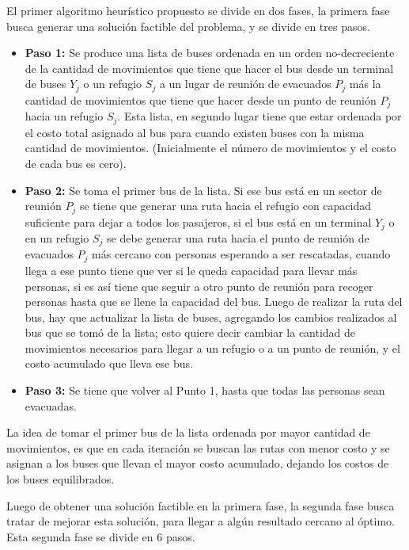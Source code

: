 \documentclass[letter, 10pt]{article}
\begin{document}
El primer algoritmo heurístico propuesto \cite{bish2011planning} se divide en dos fases, la primera fase busca generar una solución factible del problema, y se divide en tres pasos.
\begin{itemize}
\item \textbf{Paso 1:} Se produce una lista de buses ordenada en un orden no-decreciente de la cantidad de movimientos que tiene que hacer el bus desde un terminal de buses $Y_j$ o un refugio $S_j$ a un lugar de reunión de evacuados $P_j$ más la cantidad de movimientos que tiene que hacer desde un punto de reunión $P_j$ hacia un refugio $S_j$. Esta lista, en segundo lugar tiene que estar ordenada por el costo total asignado al bus para cuando existen buses con la misma cantidad de movimientos. (Inicialmente el número de movimientos y el costo de cada bus es cero).  
\item \textbf{Paso 2:} Se toma el primer bus de la lista. Si ese bus está en un sector de reunión $P_j$ se tiene que generar una ruta hacia el refugio con capacidad suficiente para dejar a todos los pasajeros, si el bus está en un terminal $Y_j$ o en un refugio $S_j$ se debe generar una ruta hacia el punto de reunión de evacuados $P_j$ más cercano con personas esperando a ser rescatadas, cuando llega a ese punto tiene que ver si le queda capacidad para llevar más personas, si es así tiene que seguir a otro punto de reunión para recoger personas hasta que se llene la capacidad del bus. Luego de realizar la ruta del bus, hay que actualizar la lista de buses, agregando los cambios realizados al bus que se tomó de la lista; esto quiere decir cambiar la cantidad de movimientos necesarios para llegar a un refugio o a un punto de reunión, y el costo acumulado que lleva ese bus.

\item \textbf{Paso 3:} Se tiene que volver al Punto 1, hasta que todas las personas sean evacuadas.
\end{itemize}

La idea de tomar el primer bus de la lista ordenada por mayor cantidad de movimientos, es que en cada iteración se buscan las rutas con menor costo y se asignan a los buses que llevan el mayor costo acumulado, dejando los costos de los buses equilibrados.

Luego de obtener una solución factible en la primera fase, la segunda fase busca tratar de mejorar esta solución, para llegar a algún resultado cercano al óptimo. Esta segunda fase se divide en 6 pasos.
\end{document}
